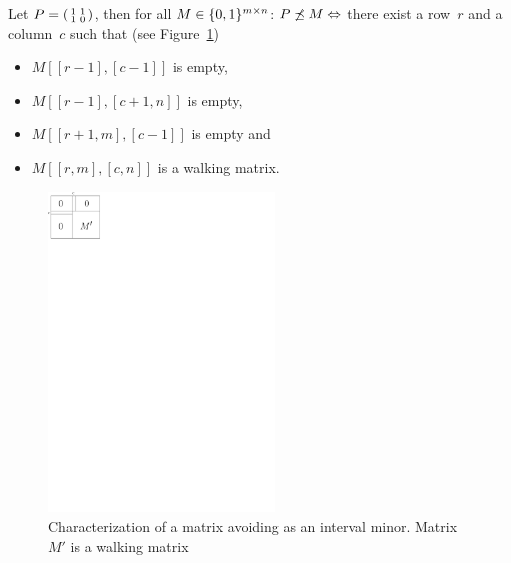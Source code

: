 \begin{thm}
\label{theorem1}
Let $P=\left(\begin{smallmatrix}1&1\\1&0\end{smallmatrix}\right)$, then for all $M\in\{0,1\}^{m\times n}$: $P\not\preceq M\Leftrightarrow$ there exist a row~$r$ and a column~$c$ such that (see Figure~\ref{p12})
\begin{itemize}
\item $M[[r-1],[c-1]]$ is empty,
\item $M[[r-1],[c+1,n]]$ is empty,
\item $M[[r+1,m],[c-1]]$ is empty and
\item $M[[r,m],[c,n]]$ is a walking matrix.
\end{itemize}
\end{thm}
\begin{figure}[h!]
\centering
\includegraphics[width=60mm]{img/p12.pdf}
\caption{Characterization of a matrix avoiding \usebox{\smlmat} as an interval minor. Matrix $M'$ is a walking matrix}
\label{p12}
\end{figure}
